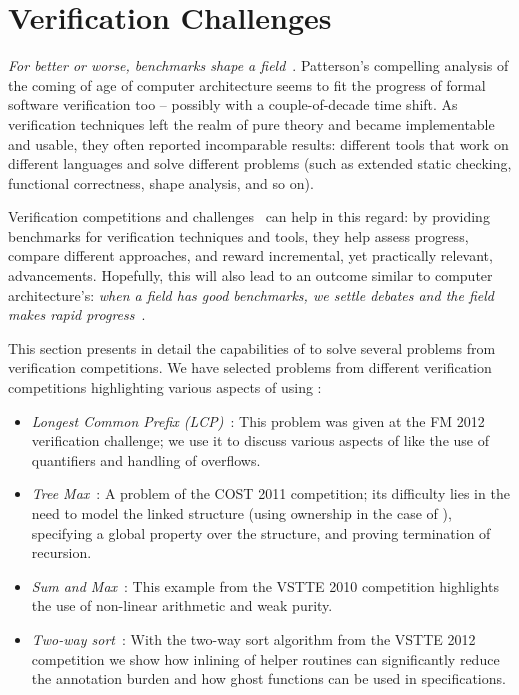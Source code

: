 \section{Verification Challenges}
\label{sec:eval-challenges}

\emph{For better or worse, benchmarks shape a field}~\cite{PATTERSON12}.
Patterson's compelling analysis of the coming of age of computer architecture seems to fit the progress of formal software verification too -- possibly with a couple-of-decade time shift.
As verification techniques left the realm of pure theory and became implementable and usable, they often reported incomparable results: different tools that work on different languages and solve different problems (such as extended static checking, functional correctness, shape analysis, and so on).

Verification competitions and challenges~\cite{KLEBANOV11,BORMER11,FILLIATRE12,HUISMAN12} can help in this regard: by providing benchmarks for verification techniques and tools, they help assess progress, compare different approaches, and reward incremental, yet practically relevant, advancements.
Hopefully, this will also lead to an outcome similar to computer architecture's: \emph{when a field has good benchmarks, we settle debates and the field makes rapid progress}~\cite{PATTERSON12}.

This section presents in detail the capabilities of \AutoProof to solve several problems from verification competitions. We have selected problems from different verification competitions highlighting various aspects of using \AutoProof:
\begin{itemize}
\item \emph{Longest Common Prefix (LCP)}~\cite{HUISMAN12}: This problem was given at the FM 2012 verification challenge; we use it to discuss various aspects of \AutoProof like the use of quantifiers and handling of overflows.

\item \emph{Tree Max}~\cite{BORMER11}: A problem of the COST 2011 competition; its difficulty lies in the need to model the linked structure (using ownership in the case of \AutoProof), specifying a global property over the structure, and proving termination of recursion.

\item \emph{Sum and Max}~\cite{KLEBANOV11}: This example from the VSTTE 2010 competition highlights the use of non-linear arithmetic and weak purity.

\item \emph{Two-way sort}~\cite{FILLIATRE12}: With the two-way sort algorithm from the VSTTE 2012 competition we show how inlining of helper routines can significantly reduce the annotation burden and how ghost functions can be used in specifications.

\end{itemize}


